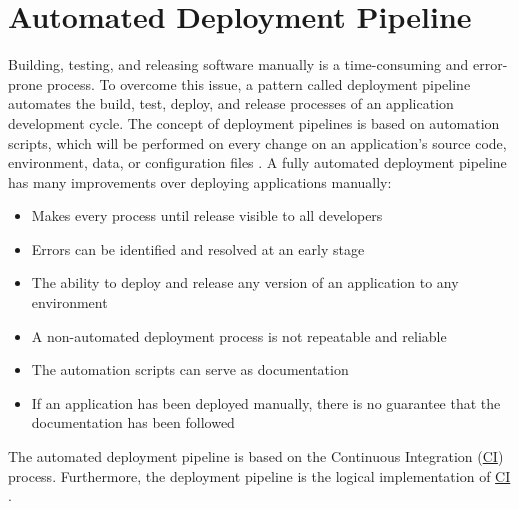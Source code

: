 \section{Automated Deployment Pipeline}
Building, testing, and releasing software manually is a time-consuming and error-prone process.
To overcome this issue, a pattern called deployment pipeline automates the build, test, deploy, and release processes of an application development cycle.
The concept of deployment pipelines is based on automation scripts, which will be performed on every change on an application's source code, environment, data, or configuration files \cite{Farley2010CI}.
A fully automated deployment pipeline has many improvements over deploying applications manually:
\begin{itemize}
\item Makes every process until release visible to all developers \cite{Farley2010CI}
\item Errors can be identified and resolved at an early stage \cite{Farley2010CI}
\item The ability to deploy and release any version of an application to any environment \cite{Farley2010CI}
\item A non-automated deployment process is not repeatable and reliable \cite{Farley2010CI}
\item The automation scripts can serve as documentation \cite{Farley2010CI}
\item If an application has been deployed manually, there is no guarantee that the documentation has been followed \cite{Farley2010CI}
\end{itemize}
The automated deployment pipeline is based on the Continuous Integration (\hyperlink{abbr:ci}{CI}) process. Furthermore, the deployment pipeline is the logical implementation of \hyperlink{abbr:ci}{CI} \cite{Farley2010CI}.


